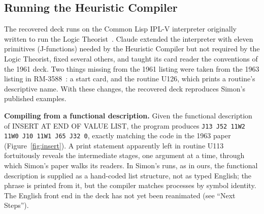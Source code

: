 \documentclass[11pt]{article}
\begin{document}
\subsection{Running the Heuristic Compiler}

The recovered deck runs on the Common Lisp IPL-V interpreter
originally written to run the Logic
Theorist~\cite{shrager2026,shragerrepo}. Claude extended the
interpreter with eleven primitives (J-functions) needed by the
Heuristic Compiler but not required by the Logic Theorist, fixed
several others, and taught its card reader the conventions of the 1961
deck. Two things missing from the 1961 listing were taken from the
1963 listing in RM-3588~\cite{simonRM3588}: a start card, and the
routine U126, which prints a routine's descriptive name. With these
changes, the recovered deck reproduces Simon's published examples.

\textbf{Compiling from a functional description.} Given the functional
description of INSERT AT END OF VALUE LIST, the program produces
\texttt{J13 J52 11W2 11W0 J10 11W1 J65 J32 0}, exactly matching the
code in the 1963 paper~\cite[pp.~499--500]{simon1963jacm}
(Figure~\ref{fig:insert}). A print statement apparently left in routine U113
fortuitously reveals the intermediate stages, one argument at a time,
through which Simon's paper walks its readers. In Simon's runs, as in ours, the functional description is
supplied as a hand-coded list structure, not as typed English; the
phrase is printed from it, but the compiler matches processes by
symbol identity. The English front end in the deck has not yet been
reanimated (see ``Next Steps'').
\end{document}
